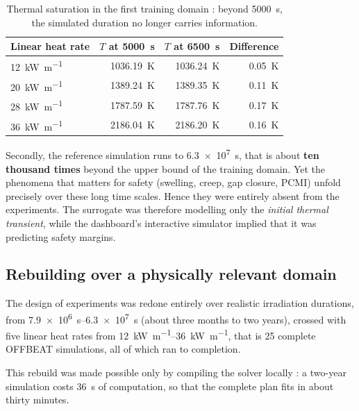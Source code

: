 \begin{table}[htbp]
\centering
\caption[Thermal saturation of the first domain]{Thermal saturation in the first
training domain : beyond \SI{5000}{\second}, the simulated duration no longer
carries information.}
\label{tab:saturation}
\begin{tabularx}{0.8\textwidth}{@{}Xrrr@{}}
\toprule
\textbf{Linear heat rate} & \textbf{$T$ at \SI{5000}{\second}} &
\textbf{$T$ at \SI{6500}{\second}} & \textbf{Difference}\\
\midrule
\SI{12}{\kilo\watt\per\metre} & \SI{1036.19}{\kelvin} & \SI{1036.24}{\kelvin}
  & \SI{0.05}{\kelvin}\\
\SI{20}{\kilo\watt\per\metre} & \SI{1389.24}{\kelvin} & \SI{1389.35}{\kelvin}
  & \SI{0.11}{\kelvin}\\
\SI{28}{\kilo\watt\per\metre} & \SI{1787.59}{\kelvin} & \SI{1787.76}{\kelvin}
  & \SI{0.17}{\kelvin}\\
\SI{36}{\kilo\watt\per\metre} & \SI{2186.04}{\kelvin} & \SI{2186.20}{\kelvin}
  & \SI{0.16}{\kelvin}\\
\bottomrule
\end{tabularx}
\end{table}

Secondly, the reference simulation runs to \SI{6.3e7}{\second}, that
is about \textbf{ten thousand times} beyond the upper bound of the training
domain. Yet the phenomena that matters for safety (swelling, creep, gap closure,
PCMI) unfold precisely over these long time scales. Hence they were entirely absent from the
experiments. The surrogate was therefore modelling only the
\emph{initial thermal transient}, while the dashboard's interactive simulator
implied that it was predicting safety margins.

\subsection{Rebuilding over a physically relevant domain}

The design of experiments was redone entirely over realistic irradiation
durations, from \SIrange{7.9e6}{6.3e7}{\second} (about three months to two
years), crossed with five linear heat rates from
\SIrange{12}{36}{\kilo\watt\per\metre}, that is \num{25} complete OFFBEAT
simulations, all of which ran to completion.

This rebuild was made possible only by compiling the solver locally : a two-year
simulation costs \SI{36}{\second} of computation, so that the complete plan fits
in about thirty minutes.

